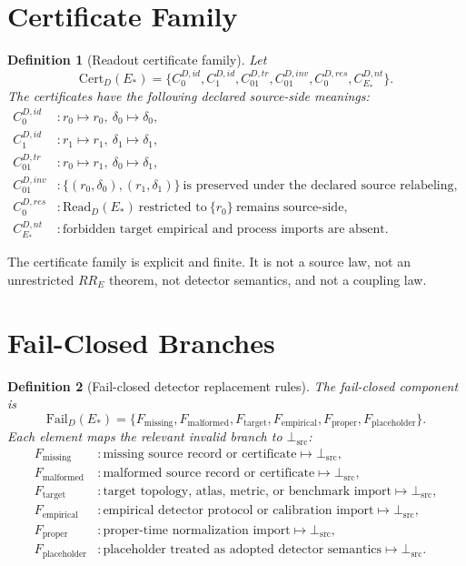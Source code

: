 \documentclass[11pt]{article}
\newcommand{\EStar}{E_{\ast}}
\newcommand{\ReadD}{\mathrm{Read}_{D}(E_{\ast})}
\newcommand{\CertD}{\mathrm{Cert}_{D}(E_{\ast})}
\newcommand{\FailD}{\mathrm{Fail}_{D}(E_{\ast})}
\newcommand{\BottomSrc}{\bot_{\mathrm{src}}}
\newtheorem{definition}{Definition}
\begin{document}
\section{Certificate Family}

\begin{definition}[Readout certificate family]
Let
\[
  \CertD=\{C^{D,id}_0,C^{D,id}_1,C^{D,tr}_{01},C^{D,inv}_{01},
  C^{D,res}_0,C^{D,nt}_{\EStar}\}.
\]
The certificates have the following declared source-side meanings:
\[
\begin{array}{ll}
C^{D,id}_0 &: r_0\mapsto r_0,\ \delta_0\mapsto\delta_0,\\
C^{D,id}_1 &: r_1\mapsto r_1,\ \delta_1\mapsto\delta_1,\\
C^{D,tr}_{01} &: r_0\mapsto r_1,\ \delta_0\mapsto\delta_1,\\
C^{D,inv}_{01} &: \{(r_0,\delta_0),(r_1,\delta_1)\}\ \text{is preserved under the declared source relabeling},\\
C^{D,res}_0 &: \ReadD\ \text{restricted to}\ \{r_0\}\ \text{remains source-side},\\
C^{D,nt}_{\EStar} &: \text{forbidden target empirical and process imports are absent}.
\end{array}
\]
\end{definition}

The certificate family is explicit and finite. It is not a source law, not an
unrestricted \(RR_E\) theorem, not detector semantics, and not a coupling law.

\section{Fail-Closed Branches}

\begin{definition}[Fail-closed detector replacement rules]
The fail-closed component is
\[
  \FailD=\{
  F_{\mathrm{missing}},
  F_{\mathrm{malformed}},
  F_{\mathrm{target}},
  F_{\mathrm{empirical}},
  F_{\mathrm{proper}},
  F_{\mathrm{placeholder}}
  \}.
\]
Each element maps the relevant invalid branch to \(\BottomSrc\):
\[
\begin{array}{ll}
F_{\mathrm{missing}} &: \text{missing source record or certificate}\mapsto\BottomSrc,\\
F_{\mathrm{malformed}} &: \text{malformed source record or certificate}\mapsto\BottomSrc,\\
F_{\mathrm{target}} &: \text{target topology, atlas, metric, or benchmark import}\mapsto\BottomSrc,\\
F_{\mathrm{empirical}} &: \text{empirical detector protocol or calibration import}\mapsto\BottomSrc,\\
F_{\mathrm{proper}} &: \text{proper-time normalization import}\mapsto\BottomSrc,\\
F_{\mathrm{placeholder}} &: \text{placeholder treated as adopted detector semantics}\mapsto\BottomSrc.
\end{array}
\]
\end{definition}
\end{document}
